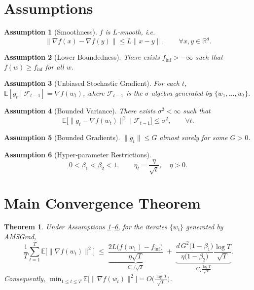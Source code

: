 \documentclass{article}
\newtheorem{theorem}{Theorem}
\newtheorem{assumption}{Assumption}
\begin{document}
\section*{Assumptions}
\begin{assumption}[Smoothness]\label{asm:smooth}
$f$ is $L$‑smooth, i.e.
\[
\|\nabla f(x)-\nabla f(y)\|\le L\|x-y\|,\qquad\forall x,y\in\mathbb{R}^d.
\]
\end{assumption}
\begin{assumption}[Lower Boundedness]\label{asm:lb}
There exists $f_{\inf}>-\infty$ such that $f(w)\ge f_{\inf}$ for all $w$.
\end{assumption}
\begin{assumption}[Unbiased Stochastic Gradient]\label{asm:unbiased}
For each $t$, $\mathbb{E}[g_t\mid \mathcal{F}_{t-1}]=\nabla f(w_t)$,
where $\mathcal{F}_{t-1}$ is the $\sigma$‑algebra generated by $\{w_1,\dots,w_t\}$.
\end{assumption}
\begin{assumption}[Bounded Variance]\label{asm:var}
There exists $\sigma^2<\infty$ such that
\[
\mathbb{E}\big[\|g_t-\nabla f(w_t)\|^2\mid \mathcal{F}_{t-1}\big]\le\sigma^2,\qquad\forall t.
\]
\end{assumption}
\begin{assumption}[Bounded Gradients]\label{asm:gradbound}
$\|g_t\|\le G$ almost surely for some $G>0$.
\end{assumption}
\begin{assumption}[Hyper‑parameter Restrictions]\label{asm:params}
\[
0<\beta_1<\beta_2<1,\qquad
\eta_t = \frac{\eta}{\sqrt{t}},\quad \eta>0.
\]
\end{assumption}

\section*{Main Convergence Theorem}
\begin{theorem}\label{thm:main}
Under Assumptions \ref{asm:smooth}–\ref{asm:params}, for the iterates $\{w_t\}$ generated by AMSGrad,
\[
\frac{1}{T}\sum_{t=1}^{T}\mathbb{E}\big[\|\nabla f(w_t)\|^2\big]
\;\le\;
\underbrace{\frac{2L\big(f(w_1)-f_{\inf}\big)}{\eta\sqrt{T}}}_{\displaystyle C_1/\sqrt{T}}
\;+\;
\underbrace{\frac{d\,G^2\big(1-\beta_1\big)}{\eta\big(1-\beta_2\big)}\frac{\log T}{\sqrt{T}}}_{\displaystyle C_2\frac{\log T}{\sqrt{T}}}.
\]
Consequently, $\displaystyle \min_{1\le t\le T}\mathbb{E}\big[\|\nabla f(w_t)\|^2\big]=O\!\big(\tfrac{\log T}{\sqrt{T}}\big)$.
\end{theorem}
\end{document}
